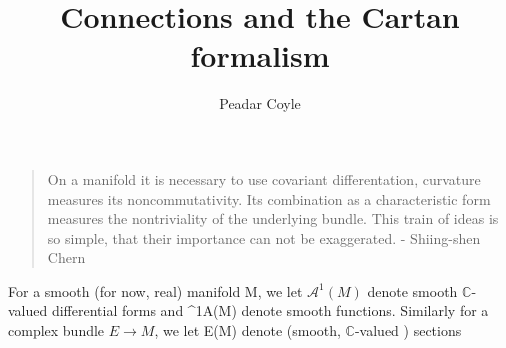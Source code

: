 \documentclass[12pt, oneside, a4paper]{article}
\title{\bf Connections and the Cartan formalism}
\author{Peadar Coyle}
\theoremstyle{definition}
\def\Cbb{\ensuremath{\mathbb{C}}}
\begin{document}
\maketitle

\begin{quotation}
 On a manifold it is necessary to use covariant differentation, curvature measures its noncommutativity. Its combination 
as a characteristic form measures the nontriviality of the underlying bundle. This train of ideas is so simple, that their
importance can not be exaggerated. - Shiing-shen Chern
\end{quotation}

For a smooth (for now, real) manifold M, we let $\mathcal{A}^{1}(M)$ denote smooth \Cbb-valued differential forms and ^{1}A(M) denote
smooth functions. Similarly for a complex bundle $E \to M$, we let E(M) denote (smooth, \Cbb-valued ) sections
\end{document}
